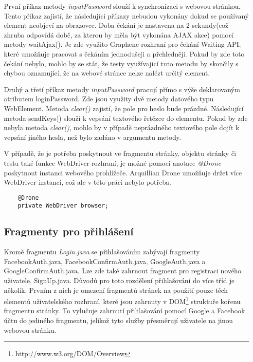 \documentclass[
    color,   %
	table,   %
    twoside, %
]{fithesis3}
\begin{document}
První příkaz metody \emph{inputPassword} slouží k synchronizaci s webovou stránkou. Tento příkaz zajistí, že následující příkazy nebudou vykonány dokud se používaný element neobjeví na obrazovce. Doba čekání je nastavena na 2 sekundy(což zhruba odpovídá době, za kterou by měla být vykonána AJAX akce) pomocí metody waitAjax(). Je zde využito Graphene rozhraní pro čekání Waiting API, které umožňuje pracovat s čekáním jednodušeji a přehledněji.  Pokud by zde toto čekání nebylo, mohlo by se stát, že testy využívající tuto metodu by skončily s chybou oznamující, že na webové stránce nelze nalézt určitý element.

Druhý a třetí příkaz metody \emph{inputPassword} pracují přímo s výše deklarovaným atributem loginPassword. Zde jsou využity dvě metody datového typu WebElement. Metoda \emph{clear()} zajistí, že pole pro heslo bude prázdné. Následující metoda sendKeys() slouží k vepsání textového řetězce do elementu. Pokud by zde nebyla metoda \emph{clear()}, mohlo by v případě neprázdného textového pole dojít k vepsání jiného hesla, než bylo zadáno v argumentu metody.

V případě, že je potřeba poskytnout ve fragmentu stránky, objektu stránky či testu také funkce WebDriver rozhraní, je možné pomocí anotace \emph{@Drone} poskytnout instanci webového prohlížeče. Arquillian Drone umožňuje držet více WebDriver instancí, což ale v této práci nebylo potřeba.

\begin{lstlisting}
	@Drone
	private WebDriver browser;
\end{lstlisting} 

\subsection*{Fragmenty pro přihlášení}
Kromě fragmentu \emph{Login.java} se přihlašováním zabývají fragmenty FacebookAuth.java, FacebookConfirmAuth.java, GoogleAuth.java a GoogleConfirmAuth.java. Lze zde také zahrnout fragment pro registraci nového uživatele, SignUp.java. Důvodů pro toto rozdělení přihlašování do více tříd je několik. Prvním z nich je omezení fragmentů stránek na použití pouze těch elementů uživatelského rozhraní, které jsou zahrnuty v DOM\footnote{http://www.w3.org/DOM/Overview} struktuře kořenu fragmentu stránky. To vylučuje zahrnutí přihlašování pomocí Google a Facebook účtu do jediného fragmentu, jelikož tyto služby přesměrují uživatele na jinou webovou stránku.
\end{document}
